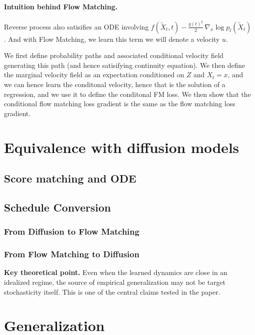 \documentclass[10pt,a4paper]{article}
\theoremstyle{definition}
\begin{document}
\paragraph{Intuition behind Flow Matching.}
Reverse process also satisifies an ODE involving $f(\tilde{X}_t,t) - \frac{g(t)^2}{2}\,\nabla_x\log p_t(\tilde{X}_t)$. And with Flow Matching, we learn this term we will denote a velocity $u$.

We first define probability paths and associated conditional velocity field generating this path (and hence satisifying continuity equation). We then define the marginal velocity field as an expectation conditioned on $Z$ and $X_t = x$, and we can hence learn the conditonal velocity, hence that is the solution of a regression, and we use it to define the conditonal FM loss. We then show that the conditional flow matching loss gradient is the same as the flow matching loss gradient. 

\section{Equivalence with diffusion models}

\subsection{Score matching and ODE}

\subsection{Schedule Conversion}

\subsubsection*{From Diffusion to Flow Matching}

\subsubsection*{From Flow Matching to Diffusion}


\begin{takeawaybox}
\textbf{Key theoretical point.}
Even when the learned dynamics are close in an idealized regime, the source of empirical generalization may not be target stochasticity itself. This is one of the central claims tested in the paper.
\end{takeawaybox}

\section{Generalization}
\end{document}
